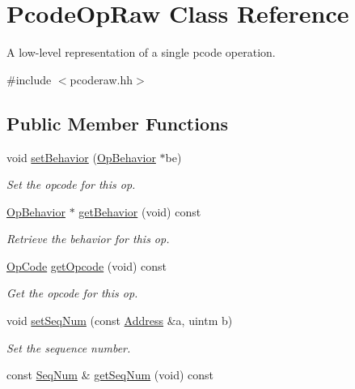 \hypertarget{class_pcode_op_raw}{}\section{Pcode\+Op\+Raw Class Reference}
\label{class_pcode_op_raw}


A low-\/level representation of a single pcode operation.  




{\ttfamily \#include $<$pcoderaw.\+hh$>$}

\subsection*{Public Member Functions}
\begin{DoxyCompactItemize}
\item 
void \mbox{\hyperlink{class_pcode_op_raw_a294ebc1a204972cfdc831faf6aff3f48}{set\+Behavior}} (\mbox{\hyperlink{class_op_behavior}{Op\+Behavior}} $\ast$be)
\begin{DoxyCompactList}\small\item\em Set the opcode for this op. \end{DoxyCompactList}\item 
\mbox{\hyperlink{class_op_behavior}{Op\+Behavior}} $\ast$ \mbox{\hyperlink{class_pcode_op_raw_ac790c26c33b84b492ce1146dfc813c8d}{get\+Behavior}} (void) const
\begin{DoxyCompactList}\small\item\em Retrieve the behavior for this op. \end{DoxyCompactList}\item 
\mbox{\hyperlink{opcodes_8hh_abeb7dfb0e9e2b3114e240a405d046ea7}{Op\+Code}} \mbox{\hyperlink{class_pcode_op_raw_a6c8a73aa191303dfb59ea23acf9edd42}{get\+Opcode}} (void) const
\begin{DoxyCompactList}\small\item\em Get the opcode for this op. \end{DoxyCompactList}\item 
void \mbox{\hyperlink{class_pcode_op_raw_afabdf56ea3e97062b7daf2af34f741a1}{set\+Seq\+Num}} (const \mbox{\hyperlink{class_address}{Address}} \&a, uintm b)
\begin{DoxyCompactList}\small\item\em Set the sequence number. \end{DoxyCompactList}\item 
const \mbox{\hyperlink{class_seq_num}{Seq\+Num}} \& \mbox{\hyperlink{class_pcode_op_raw_a7845603fd30656ce6c99273a8498f4a7}{get\+Seq\+Num}} (void) const

\end{DoxyCompactItemize}

